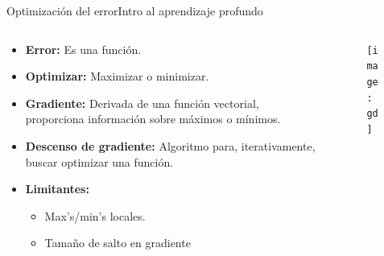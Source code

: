 \documentclass[10pt,border=3pt,tikz]{beamer}
\begin{document}
    \begin{frame}{Optimización del error}{Intro al aprendizaje profundo}
        \begin{columns}
            \begin{column}{0.6\textwidth}
                \begin{itemize}
                    \item \textbf{Error:} Es una función.
                    \item \textbf{Optimizar:} Maximizar o minimizar.
                    \item \textbf{Gradiente:} Derivada de una función vectorial, proporciona información sobre máximos o mínimos.
                    \item \textbf{Descenso de gradiente:} Algoritmo para, iterativamente, buscar optimizar una función.
                    \item \textbf{Limitantes:} 
                        \begin{itemize}
                            \item Max's/min's locales.
                            \item Tamaño de salto en gradiente
                        \end{itemize}
                \end{itemize}
            \end{column}
            \begin{column}{0.35\textwidth}
                \begin{figure}
                    \centering
                    \texttt{[image: gd]}
                \end{figure}
            \end{column}
        \end{columns}
    \end{frame}
    
\end{document}
